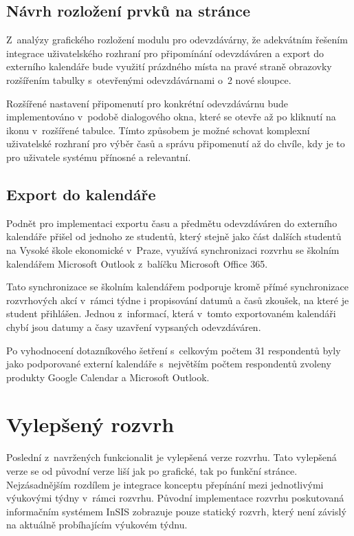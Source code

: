 \subsection{Návrh rozložení prvků na stránce}

Z~analýzy grafického rozložení modulu pro odevzdávárny, že adekvátním řešením integrace uživatelského rozhraní pro připomínání odevzdáváren a export do externího kalendáře bude využití prázdného místa na pravé straně obrazovky rozšířením tabulky s~otevřenými odevzdávárnami o~2 nové sloupce.

Rozšířené nastavení připomenutí pro konkrétní odevzdávárnu bude implementováno v~podobě dialogového okna, které se otevře až po kliknutí na ikonu v~rozšířené tabulce. Tímto způsobem je možné schovat komplexní uživatelské rozhraní pro výběr časů a správu připomenutí až do chvíle, kdy je to pro uživatele systému přínosné a relevantní. 

\subsection{Export do kalendáře}

Podnět pro implementaci exportu času a předmětu odevzdáváren do externího kalendáře přišel od jednoho ze studentů, který stejně jako část dalších studentů na Vysoké škole ekonomické v~Praze, využívá synchronizaci rozvrhu se školním kalendářem Microsoft Outlook z~balíčku Microsoft Office 365.

Tato synchronizace se školním kalendářem podporuje kromě přímé synchronizace rozvrhových akcí v~rámci týdne i propisování datumů a časů zkoušek, na které je student přihlášen. Jednou z~informací, která v~tomto exportovaném kalendáři chybí jsou datumy a časy uzavření vypsaných odevzdáváren.

Po vyhodnocení dotazníkového šetření s~celkovým počtem 31 respondentů byly jako podporované externí kalendáře s~největším počtem respondentů zvoleny produkty Google Calendar a Microsoft Outlook.

\section{Vylepšený rozvrh}\label{sec:vylepseny-rozvrh}

Poslední z~navržených funkcionalit je vylepšená verze rozvrhu. Tato vylepšená verze se od původní verze liší jak po grafické, tak po funkční stránce. Nejzásadnějším rozdílem je integrace konceptu přepínání mezi jednotlivými výukovými týdny v~rámci rozvrhu. Původní implementace rozvrhu poskutovaná informačním systémem InSIS zobrazuje pouze statický rozvrh, který není závislý na aktuálně probíhajícím výukovém týdnu. 

